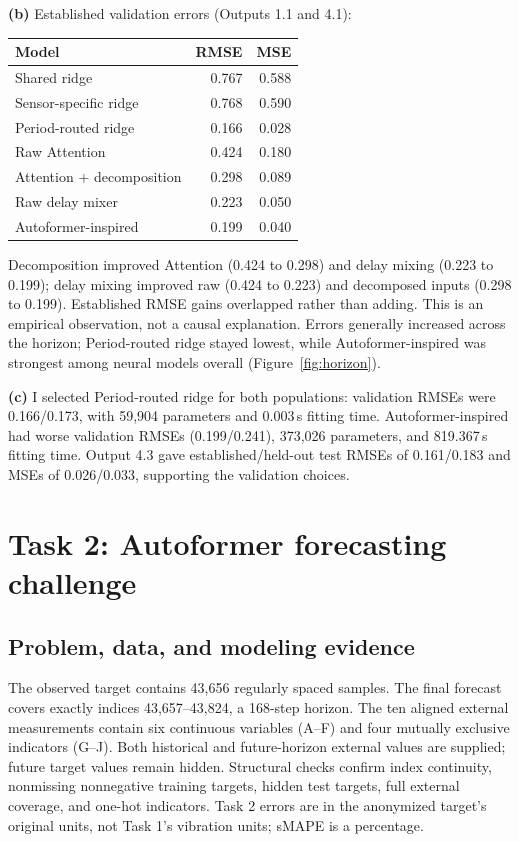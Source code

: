 \documentclass[11pt,a4paper]{article}
\begin{document}
\textbf{(b)} Established validation errors (Outputs 1.1 and 4.1):
\begin{center}
\small
\begin{tabular}{lrr}
\toprule
Model & RMSE & MSE \\
\midrule
Shared ridge & 0.767 & 0.588 \\
Sensor-specific ridge & 0.768 & 0.590 \\
Period-routed ridge & 0.166 & 0.028 \\
Raw Attention & 0.424 & 0.180 \\
Attention + decomposition & 0.298 & 0.089 \\
Raw delay mixer & 0.223 & 0.050 \\
Autoformer-inspired & 0.199 & 0.040 \\
\bottomrule
\end{tabular}
\end{center}

Decomposition improved Attention (0.424 to 0.298) and delay mixing (0.223 to 0.199); delay mixing improved raw (0.424 to 0.223) and decomposed inputs (0.298 to 0.199). Established RMSE gains overlapped rather than adding. This is an empirical observation, not a causal explanation. Errors generally increased across the horizon; Period-routed ridge stayed lowest, while Autoformer-inspired was strongest among neural models overall (Figure~\ref{fig:horizon}).

\textbf{(c)} I selected Period-routed ridge for both populations: validation RMSEs were 0.166/0.173, with 59,904 parameters and 0.003\,s fitting time. Autoformer-inspired had worse validation RMSEs (0.199/0.241), 373,026 parameters, and 819.367\,s fitting time. Output 4.3 gave established/held-out test RMSEs of 0.161/0.183 and MSEs of 0.026/0.033, supporting the validation choices.

\clearpage
\section*{Task 2: Autoformer forecasting challenge}
\subsection*{Problem, data, and modeling evidence}
The observed target contains 43,656 regularly spaced samples. The final forecast covers exactly indices 43,657--43,824, a 168-step horizon. The ten aligned external measurements contain six continuous variables (A--F) and four mutually exclusive indicators (G--J). Both historical and future-horizon external values are supplied; future target values remain hidden. Structural checks confirm index continuity, nonmissing nonnegative training targets, hidden test targets, full external coverage, and one-hot indicators. Task 2 errors are in the anonymized target's original units, not Task 1's vibration units; sMAPE is a percentage.
\end{document}
